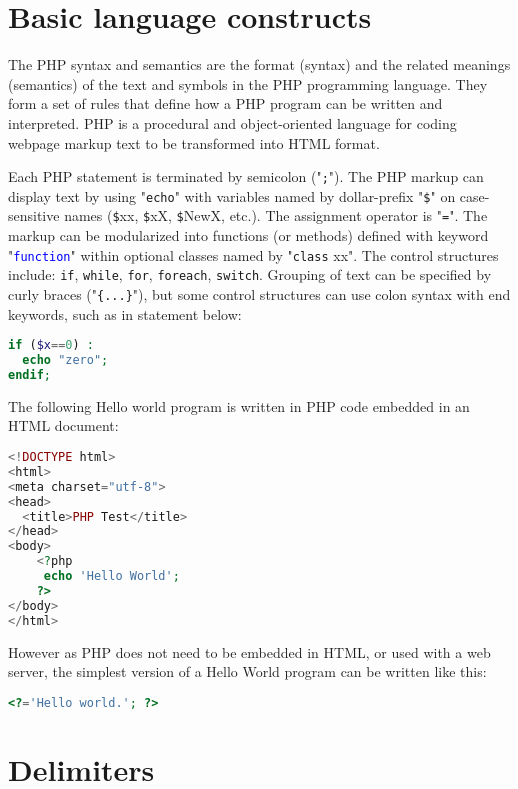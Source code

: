 \section{Basic language constructs}


The PHP syntax and semantics are the format (syntax) and the related meanings (semantics) of the text and symbols in the PHP programming language. They form a set of rules that define how a PHP program can be written and interpreted. PHP is a procedural and object-oriented language for coding webpage markup text to be transformed into HTML format.


Each PHP statement is terminated by semicolon ("\texttt{;}"). The PHP markup can display text by using "\texttt{echo}" with variables named by dollar-prefix "\texttt{\$}" on case-sensitive names (\texttt{\$}xx, \texttt{\$}xX, \texttt{\$}NewX, etc.). The assignment operator is "\texttt{=}". The markup can be modularized into functions (or methods) defined with keyword "\textcolor{Blue}{\texttt{function}}" within optional classes named by "\texttt{class} xx". The control structures include: \texttt{if}, \texttt{while}, \texttt{for}, \texttt{foreach}, \texttt{switch}. Grouping of text can be specified by curly braces ("\texttt{\{...\}}"), but some control structures can use colon syntax with end keywords, such as in statement below:

\begin{lstlisting}[language=PHP]
if ($x==0) : 
  echo "zero"; 
endif;
\end{lstlisting}


The following Hello world program is written in PHP code embedded in an HTML document:

\begin{lstlisting}[language=PHP]
<!DOCTYPE html>
<html>
<meta charset="utf-8">
<head>
  <title>PHP Test</title>
</head>
<body>
	<?php
	 echo 'Hello World';
	?>
</body>
</html>
\end{lstlisting}




However as PHP does not need to be embedded in HTML, or used with a web server, the simplest version of a Hello World program can be written like this:

\begin{lstlisting}[language=PHP]
<?='Hello world.'; ?>
\end{lstlisting}

\section{Delimiters}



